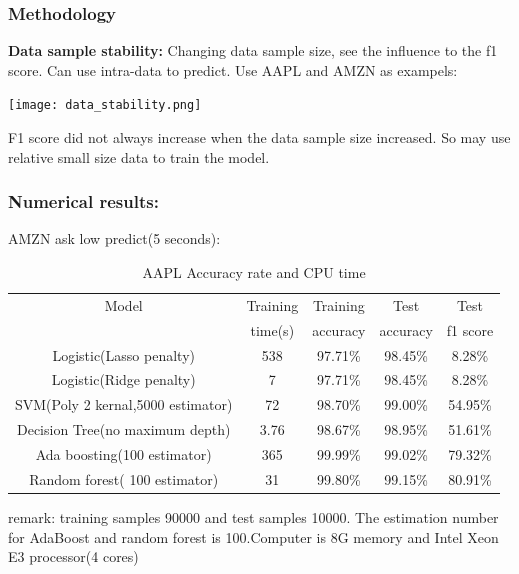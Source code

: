 \documentclass[xcolor={x11names,svgnames,dvipsnames}]{beamer}
\begin{document}
\begin{frame}
\frametitle{Methodology}
\textbf{Data sample stability:}
Changing data sample size, see the influence to the f1 score. Can use intra-data to predict. Use AAPL and AMZN as exampels:\\

\begin{center}
     \texttt{[image: data\_stability.png]}
\end{center}

F1 score did not always increase when the data sample size increased. So may use relative small size data to train the model.

\end{frame}
\begin{frame}
\frametitle{Numerical results:}

\begin{block}{AMZN ask low predict(5 seconds):}
\begin{table}[h!]\scriptsize
  \caption{AAPL Accuracy rate and CPU time}
\begin{center}
    \begin{tabular}{| c | c|c|c|c|}
    \hline

Model&	Training &	Training &	Test &	Test\\
&	time(s)&	accuracy&	accuracy&	f1 score\\
    \hline
Logistic(Lasso penalty)&	538&	97.71\%& 	98.45\%& 	8.28\%\\
Logistic(Ridge penalty)	& 7&	97.71\%& 	98.45\%& 	8.28\%\\
SVM(Poly 2 kernal,5000 estimator)&  	72& 	98.70\%& 	99.00\%&	54.95\%\\
Decision Tree(no maximum depth)&	3.76& 	98.67\%& 	98.95\%& 	51.61\% \\
Ada boosting(100 estimator)&	365& 	99.99\%& 	99.02\%& 	\alert{79.32}\%\\
Random forest( 100 estimator)&	31& 	99.80\%& 	99.15\%& 	\alert{80.91}\%\\


\hline
\end{tabular}
\end{center}
\end{table}
\end{block}
\small{remark: \alert{training samples 90000 and test samples 10000}. The estimation number for AdaBoost and random forest is 100.Computer is 8G memory and Intel Xeon E3 processor(4 cores)}
\end{frame}​
\end{document}
